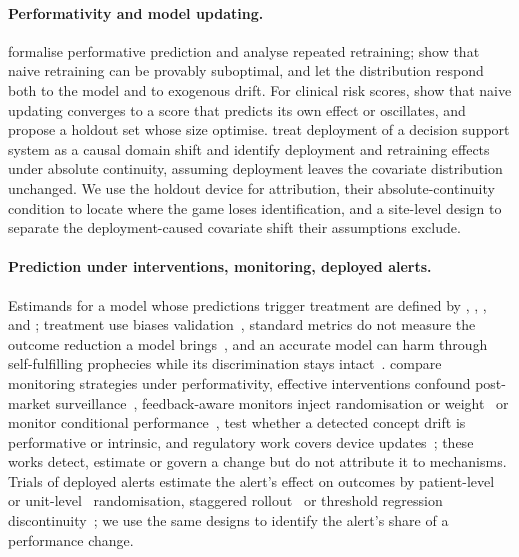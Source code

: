 \documentclass[letterpaper]{article} %
\begin{document}
\paragraph{Performativity and model updating.} \citet{perdomo2020performative}
formalise performative prediction and analyse repeated retraining;
\citet{kabra2024limitations} show that naive retraining can be provably
suboptimal, and \citet{lee2026partially} let the distribution respond both to
the model and to exogenous drift. For clinical risk scores,
\citet{liley2021model} show that naive updating converges to a score that
predicts its own effect or oscillates, and propose a holdout set whose size
\citet{haidarwehbe2025holdout} optimise. \citet{boeken2024evaluating} treat
deployment of a decision support system as a causal domain shift and identify
deployment and retraining effects under absolute continuity, assuming
deployment leaves the covariate distribution unchanged. We use the holdout
device for attribution, their absolute-continuity condition to locate where
the game loses identification, and a site-level design to separate the
deployment-caused covariate shift their assumptions exclude.

\paragraph{Prediction under interventions, monitoring, deployed alerts.}
Estimands for a model whose predictions trigger treatment are defined by
\citet{sperrin2018msm}, \citet{vangeloven2020prediction},
\citet{lin2021scoping}, \citet{keogh2024prediction} and
\citet{luijken2024estimands}; treatment use biases
validation~\citep{pajouheshnia2017accounting}, standard metrics do not measure
the outcome reduction a model brings~\citep{schuler2020performance}, and an
accurate model can harm through self-fulfilling prophecies while its
discrimination stays intact~\citep{vanamsterdam2025selffulfilling}.
\citet{feng2024designing} compare monitoring strategies under performativity,
effective interventions confound post-market
surveillance~\citep{ansari2025challenges}, feedback-aware monitors inject
randomisation or weight~\citep{corbin2023avoiding, kim2025monitoring} or
monitor conditional performance~\citep{feng2024monitoring, guan2026detecting},
\citet{gowerwinter2025performative} test whether a detected concept drift is
performative or intrinsic, and regulatory work covers device
updates~\citep{wu2024regulating, gonzalez2024regulating, afdideh2026aegis};
these works detect, estimate or govern a change but do not attribute it to
mechanisms. Trials of deployed alerts estimate the alert's effect on
outcomes by patient-level~\citep{wilson2021aki} or
unit-level~\citep{rossetti2025concern} randomisation, staggered
rollout~\citep{escobar2020automated} or threshold regression
discontinuity~\citep{gallo2024effectiveness}; we use the same designs to
identify the alert's share of a performance change.
\end{document}
